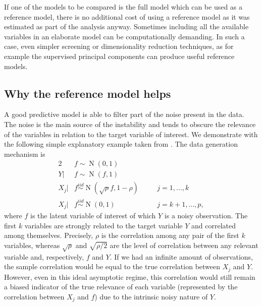 \documentclass[a4]{article}
\theoremstyle{definition}
\DeclareMathOperator{\N}{N}
\begin{document}
If one of the models to be compared is the full model which can be
used as a reference model, there is no additional cost of using a
reference model as it was estimated as part of the analysis anyway.
Sometimes including all the available variables in an
elaborate model can be computationally demanding.  In such a
case, even simpler screening or dimensionality reduction techniques,
as for example the supervised principal components
\citep{bair2006prediction,piironen2018} can produce useful reference
models.


\hypertarget{reference-model-approach}{%
\subsection{Why the reference model helps}\label{reference-model-approach}}
 
A good predictive model is able to filter part of the noise present in
the data. The noise is the main source of the instability and tends to
obscure the relevance of the variables in relation to the target
variable of interest. We demonstrate with the following simple
explanatory example taken from \cite{paper:projpred}. The data
generation mechanism is
\begin{alignat}{2} \label{eq:simulated_data}
     &f\sim \N(0,1) && \nonumber \\ 
     Y|&f\sim \N(f,1) && \\
     X_{j}|&f \overset{iid}{\sim} \N(\sqrt{\rho}f,1-\rho) \quad &&j=1,\ldots,k \nonumber \\
     X_{j}|&f \overset{iid}{\sim} \N(0,1) &&j=k+1,\ldots,p \nonumber,
\end{alignat}
where $f$ is the latent variable of interest of which $Y$ is a noisy
observation. The first $k$ variables are strongly related to the
target variable $Y$ and correlated among themselves. Precisely, $\rho$
is the correlation among any pair of the first $k$ variables, whereas
$\sqrt{\rho}$ and $\sqrt{\rho/2}$ are the level of correlation between
any relevant variable and, respectively, $f$ and $Y$. If we had an
infinite amount of observations, the sample correlation would be equal
to the true correlation between $X_j$ and $Y$. However, even in this
ideal asymptotic regime, this correlation would still remain a biased
indicator of the true relevance of each variable (represented by the
correlation between $X_j$ and $f$) due to the intrinsic noisy nature
of $Y$.
\end{document}
